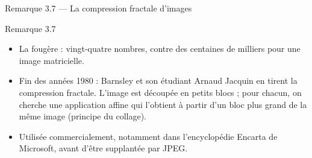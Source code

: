 \begin{frame}{Remarque 3.7 --- La compression fractale d'images}
  \begin{Rem}{Remarque 3.7}
    \begin{itemize}
      \item La fougère : vingt-quatre nombres, contre des centaines de
        milliers pour une image matricielle.
      \item Fin des années 1980 : Barnsley et son étudiant Arnaud Jacquin
        en tirent la compression fractale. L'image est découpée en petits
        blocs ; pour chacun, on cherche une application affine qui
        l'obtient à partir d'un bloc plus grand de la même image (principe
        du collage).
      \item Utilisée commercialement, notamment dans l'encyclopédie
        Encarta de Microsoft, avant d'être supplantée par JPEG.
    \end{itemize}
  \end{Rem}
\end{frame}
